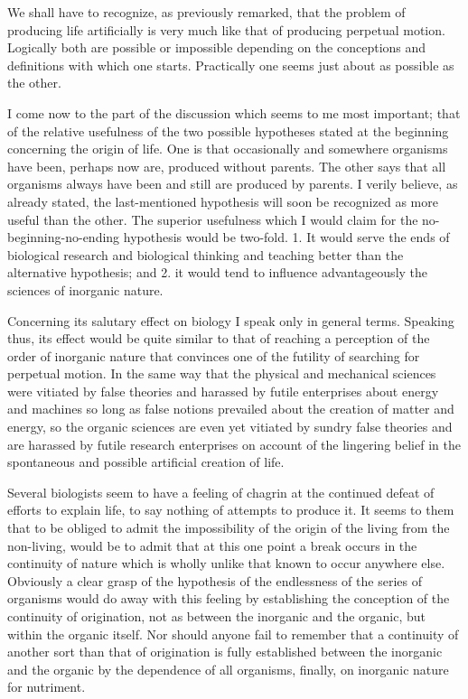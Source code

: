 \documentclass[a4paper, 11pt, oneside, polutonikogreek, english, landscape]{article}
\begin{document}
We shall have to recognize, as previously remarked, that the problem of producing life artificially is very much like that of producing perpetual motion. Logically both are possible or impossible depending on the conceptions and definitions with which one starts. Practically one seems just about as possible as the other.

I come now to the part of the discussion which seems to me most important; that of the relative usefulness of the two possible hypotheses stated at the beginning concerning the origin of life. One is that occasionally and somewhere organisms have been, perhaps now are, produced without parents. The other says that all organisms always have been and still are produced by parents. I verily believe, as already stated, the last-mentioned hypothesis will soon be recognized as more useful than the other. The superior usefulness which I would claim for the no-beginning-no-ending hypothesis would be two-fold. 1. It would serve the ends of biological research and biological thinking and teaching better than the alternative hypothesis; and 2. it would tend to influence advantageously the sciences of inorganic nature.

Concerning its salutary effect on biology I speak only in general terms. Speaking thus, its effect would be quite similar to that of reaching a perception of the order of inorganic nature that convinces one of the futility of searching for perpetual motion. In the same way that the physical and mechanical sciences were vitiated by false theories and harassed by futile enterprises about energy and machines so long as false notions prevailed about the creation of matter and energy, so the organic sciences are even yet vitiated by sundry false theories and are harassed by futile research enterprises on account of the lingering belief in the spontaneous and possible artificial creation of life.

Several biologists seem to have a feeling of chagrin at the continued defeat of efforts to explain life, to say nothing of attempts to produce it. It seems to them that to be obliged to admit the impossibility of the origin of the living from the non-living, would be to admit that at this one point a break occurs in the continuity of nature which is wholly unlike that known to occur anywhere else. Obviously a clear grasp of the hypothesis of the endlessness of the series of organisms would do away with this feeling by establishing the conception of the continuity of origination, not as between the inorganic and the organic, but within the organic itself. Nor should anyone fail to remember that a continuity of another sort than that of origination is fully established between the inorganic and the organic by the dependence of all organisms, finally, on inorganic nature for nutriment.
\end{document}
